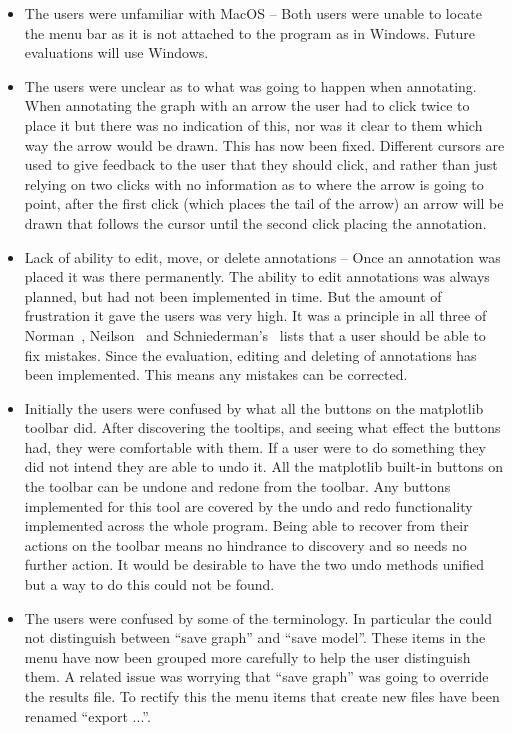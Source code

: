 \begin{itemize}
\item The users were unfamiliar with MacOS -- Both users were unable to locate the menu bar as it is not attached to the program as in Windows.  Future evaluations will use Windows.
\item The users were unclear as to what was going to happen when annotating.  When annotating the graph with an arrow the user had to click twice to place it but there was no indication of this, nor was it clear to them which way the arrow would be drawn.  This has now been fixed. Different cursors are used to give feedback to the user that they should click, and rather than just relying on two clicks with no information as to where the arrow is going to point, after the first click (which places the tail of the arrow) an arrow will be drawn that follows the cursor until the second click placing the annotation.
\item Lack of ability to edit, move, or delete annotations -- Once an annotation was placed it was there permanently.  The ability to edit annotations was always planned, but had not been implemented in time.  But the amount of frustration it gave the users was very high.  It was a principle in all three of Norman~\cite{normsev}, Neilson~\cite{neilten} and Schniederman's~\cite{shgold} lists that a user should be able to fix mistakes.  Since the evaluation, editing and deleting of annotations has been implemented.  This means any mistakes can be corrected.
\item Initially the users were confused by what all the buttons on the matplotlib toolbar did.  After discovering the tooltips, and seeing what effect the buttons had, they were comfortable with them.  If a user were to do something they did not intend they are able to undo it. All the matplotlib built-in buttons on the toolbar can be undone and redone from the toolbar.  Any buttons implemented for this tool are covered by the undo and redo functionality implemented across the whole program.  Being able to recover from their actions on the toolbar means no hindrance to discovery and so needs no further action.  It would be desirable to have the two undo methods unified but a way to do this could not be found.
\item The users were confused by some of the terminology.  In particular the could not distinguish between ``save graph'' and ``save model''. These items in the menu have now been grouped more carefully to help the user distinguish them.  A related issue was worrying that ``save graph'' was going to override the results file.  To rectify this the menu items that create new files have been renamed ``export ...''.

\end{itemize}
